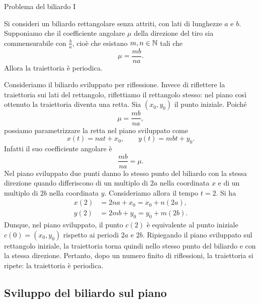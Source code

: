 \documentclass[a4paper]{article}
\begin{document}
\begin{snippetproposition}{Problema del biliardo I}
\begin{figure}
        \vspace{-1.25cm}
    \end{figure}
    Si consideri un biliardo rettangolare senza attriti, con lati di
    lunghezze \(a\) e \(b\). Supponiamo che il coefficiente angolare
    \(\mu\) della direzione del tiro sia commensurabile con
    \(\frac{b}{a}\), cioè che esistano \(m,n\in\mathbb{N}\) tali che
    \[
        \mu = \frac{mb}{na}.
    \]
    Allora la traiettoria è periodica. \wrapfill
\end{snippetproposition}

\begin{snippetproof}{}
    Consideriamo il biliardo sviluppato per riflessione. Invece di riflettere la traiettoria sui lati del rettangolo, riflettiamo il rettangolo stesso: nel piano così ottenuto la traiettoria diventa una retta.
    Sia \((x_0,y_0)\) il punto iniziale. Poiché
    \[
        \mu=\frac{mb}{na},
    \]
    possiamo parametrizzare la retta nel piano sviluppato come
    \[
        x(t)=nat+x_0,
        \qquad
        y(t)=mbt+y_0.
    \]
    Infatti il suo coefficiente angolare è
    \[
        \frac{mb}{na}=\mu.
    \]
    Nel piano sviluppato due punti danno lo stesso punto del biliardo con la stessa direzione quando differiscono di un multiplo di \(2a\) nella coordinata \(x\) e di un multiplo di \(2b\) nella coordinata \(y\). Consideriamo allora il tempo \(t=2\). Si ha
    \begin{align*}
        x(2)&=2na+x_0=x_0+n(2a),\\
        y(2)&=2mb+y_0=y_0+m(2b).
    \end{align*}
    Dunque, nel piano sviluppato, il punto \(c(2)\) è equivalente al punto iniziale \(c(0)=(x_0,y_0)\) rispetto ai periodi \(2a\) e \(2b\). Ripiegando il piano sviluppato sul rettangolo iniziale, la traiettoria torna quindi nello stesso punto del biliardo e con la stessa direzione.
    Pertanto, dopo un numero finito di riflessioni, la traiettoria si ripete: la traiettoria è periodica.
\end{snippetproof}

\subsection{Sviluppo del biliardo sul piano}
\end{document}
